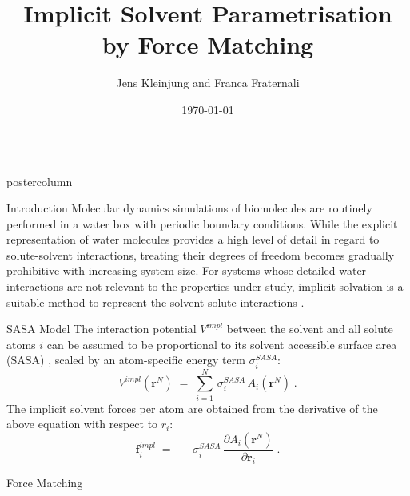 \documentclass{beamer}
\title{\huge Implicit Solvent Parametrisation by Force Matching}
\author{Jens Kleinjung and Franca Fraternali}
\institute[]{The Francis Crick Institute, King's College London}
\date{\today}
\newcommand{\sig}{$\sigma_i^{SASA}$}
\newlength{\columnheight}
\begin{document}
\begin{frame}
\begin{columns}
\begin{column}{.45\textwidth}
\begin{beamercolorbox}[center]{postercolumn}
\begin{minipage}{.98\textwidth}  %
\parbox[t][\columnheight]{\textwidth}{ %
\begin{myblock}{Introduction}
Molecular dynamics simulations of biomolecules are routinely performed in
a water box with periodic boundary conditions. While the explicit representation
of water molecules provides a high level of detail in regard to solute-solvent
interactions, treating their degrees of freedom becomes gradually prohibitive
with increasing system size. For systems whose detailed water interactions are
not relevant to the properties under study, implicit solvation is a suitable
method to represent the solvent-solute interactions
\cite{Allison:2011p4547,Kleinjung_2014}.
\end{myblock}\vfill
\begin{myblock}{SASA Model}
The interaction potential $V^{impl}$ between the solvent and all solute
atoms $i$ can be assumed to be proportional to its solvent accessible
surface area (SASA) \cite{Hasel:1988p116},
scaled by an atom-specific energy term \sig:
\begin{equation}
\label{eq:sasapot}
V^{impl}(\mathbf{r}^N) \; = \; \sum_{i=1}^{N} \, \sigma_i^{SASA} \, A_i(\mathbf{r}^N) \; .
\end{equation}
The implicit solvent forces per atom are obtained from the derivative of the above
equation with respect to $r_i$:
\begin{equation}
\label{eq:Fimpl}
\mathbf{f}_i^{impl} \; = \; - \, \sigma_i^{SASA} \, \frac{\partial A_i(\mathbf{r}^N)}{\partial \mathbf{r}_i} \; .
\end{equation}
\end{myblock}\vfill
\begin{myblock}{Force Matching}
\begin{figure}
\begin{minipage}{0.45\textwidth}

\end{minipage}
\end{figure}
\end{myblock}}
\end{minipage}
\end{beamercolorbox}
\end{column}
\end{columns}
\end{frame}
\end{document}
